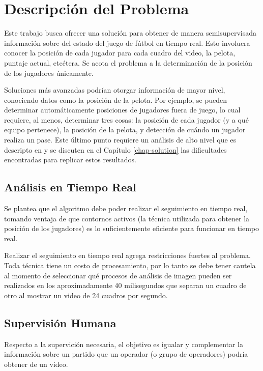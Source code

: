 \chapter{Descripción del Problema}
\label{chap-problems}

Este trabajo busca ofrecer una solución para obtener de manera semisupervisada
información sobre del estado del juego de fútbol en tiempo real. Esto involucra
conocer la posición de cada jugador para cada cuadro del video, la pelota,
puntaje actual, etcétera. Se acota el problema a la determinación de la
posición de los jugadores únicamente.

Soluciones más avanzadas podrían otorgar información de mayor nivel,
conociendo datos como la posición de la pelota. Por ejemplo, se pueden
determinar automáticamente posiciones de jugadores fuera de juego, lo cual
requiere, al menos, determinar tres cosas: la posición de cada jugador (y a qué
equipo pertenece), la posición de la pelota, y detección de cuándo un jugador
realiza un pase. Este último punto requiere un análisis de alto nivel que es
descripto en \cite{papers-tanos} y se discuten en el Capítulo \ref{chap-solution}
las dificultades encontradas para replicar estos resultados.

\section{Análisis en Tiempo Real}

Se plantea que el algoritmo debe poder realizar el seguimiento en tiempo
real, tomando ventaja de que contornos activos (la técnica utilizada para
obtener la posición de los jugadores) es lo suficientemente eficiente para
funcionar en tiempo real.

Realizar el seguimiento en tiempo real agrega restricciones fuertes al
problema. Toda técnica tiene un costo de procesamiento, por lo tanto se debe
tener cautela al momento de seleccionar qué procesos de análisis de imagen
pueden ser realizados en los aproximadamente 40 milisegundos que separan un
cuadro de otro al mostrar un video de 24 cuadros por segundo.

\section{Supervisión Humana}

Respecto a la supervición necesaria, el objetivo es igualar y complementar la
información sobre un partido que un operador (o grupo de operadores) podría
obtener de un video.

